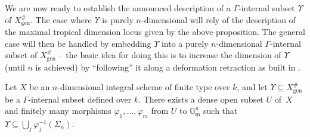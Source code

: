 \documentclass[JEP,XML,SOM,Unicode,ThmDefs,NoEqCountersInSection,published]{cedram}
\newcommand{\gm}{\bG_{\mathrm m}}
\newcommand{\bG}{\mathbb G}
\let\phi\varphi
\theoremstyle{plain}
\theoremstyle{definition}
\begin{document}
We are now ready to establish the announced description
of a $\Gamma$-internal subset $\Upsilon$ of $X^{\#}_{\mathrm{gen}}$.
The case where $\Upsilon$ is purely $n$\nobreakdash-dimen\-sional will rely of the description
of the maximal tropical dimension locus given by the above proposition.
The general case will then be handled
by embedding $\Upsilon$ into a purely $n$\nobreakdash-dimen\-sional $\Gamma$-internal subset of $X^{\#}_{\mathrm{gen}}$ --
the basic idea for doing this is to increase the dimension of $\Upsilon$ (until $n$ is achieved) by
``following'' it along a deformation retraction as built in \cite{HL}.

\begin{theo}\label{structure-pure-gammainternal}
Let $X$ be
an $n$\nobreakdash-dimen\-sional integral scheme of finite type over $k$,
and let $\Upsilon\subseteq X^\#_{\mathrm{gen}}$ be
a $\Gamma$-internal subset defined over $k$.
There exists a dense open subset $U$
of~$X$ and finitely many morphisms $\phi_1,\ldots, \phi_m$
from $U$ to $\gm^n$ such that $\Upsilon\subseteq\bigcup_j \phi_j^{-1}(\Sigma_n)$.
\end{theo}
\end{document}
